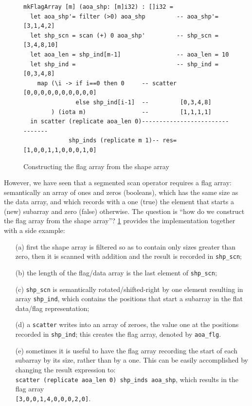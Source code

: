 \documentclass[acmsmall,review]{acmart}\settopmatter{printfolios=true,printccs=false,printacmref=false}
\begin{document}
\begin{figure}
\begin{lstlisting}[mathescape=true]
mkFlagArray [m] (aoa_shp: [m]i32) : []i32 =
  let aoa_shp'= filter (>0) aoa_shp         -- aoa_shp'= [3,1,4,2]
  let shp_scn = scan (+) 0 aoa_shp'         -- shp_scn = [3,4,8,10]
  let aoa_len = shp_ind[m-1]                -- aoa_len = 10
  let shp_ind =                             -- shp_ind = [0,3,4,8]
    map (\i -> if i==0 then 0     -- scatter [0,0,0,0,0,0,0,0,0,0]
               else shp_ind[i-1]  --         [0,3,4,8]
        ) (iota m)                --         [1,1,1,1]
  in scatter (replicate aoa_len 0)--------------------------------
             shp_inds (replicate m 1)-- res= [1,0,0,1,1,0,0,0,1,0] 
\end{lstlisting}\vspace{-4ex}
\caption{Constructing the flag array from the shape array}
\label{fig:make-flag}
\end{figure}

However, we have seen that a segmented scan operator requires
a flag array: semantically an array of ones and zeros (booleans),  
which has the same size as the data array, and which records with
a one (true) the element that starts a (new) subarray and zero (false)
otherwise. The question is ``how do we construct the flag array from
the shape array''?  \cref{fig:make-flag} provides the implementation
together with a side example:
\begin{itemize}
    \item[(a)] first the shape array is filtered so as to contain only
            sizes greater than zero, then it is scanned with addition 
            and the result is recorded in {\tt shp\_scn};
    \item[(b)] the length of the flag/data array is the last element
            of {\tt shp\_scn};
    \item[(c)] {\tt shp\_scn} is semantically rotated/shifted-right
            by one element resulting in array {\tt shp\_ind},
            which contains the positions that start a subarray
            in the flat data/flag representation;
    \item[(d)] a \lstinline{scatter} writes into an array of zeroes,
            the value one at the positions recorded in {\tt shp\_ind};
            this creates the flag array, denoted by {\tt aoa\_flg}.
    \item[(e)] sometimes it is useful to have the flag array
            recording the start of each subarray by its size,
            rather than by a one. This can be easily accomplished
            by changing the result expression to:\\
            \lstinline{scatter (replicate aoa_len 0) shp_inds aoa_shp},
            which results in the flag array\\
            {\tt[3,0,0,1,4,0,0,0,2,0]}.
\end{itemize}
\end{document}
